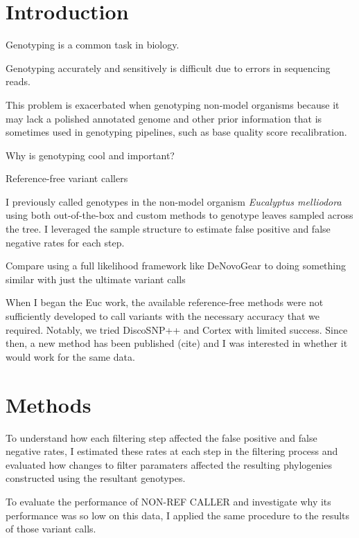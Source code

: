 \documentclass{article}
\begin{document}
\linenumbers

\section{Introduction}
\begin{outline}
	\item Genotyping is a common task in biology.
	\begin{outline}
		\item Genotyping accurately and sensitively is difficult due to errors in sequencing reads.
		\item This problem is exacerbated when genotyping non-model organisms because it may lack a polished annotated genome and other prior information that is sometimes used in genotyping pipelines, such as base quality score recalibration.
	\end{outline}
	\item Why is genotyping cool and important?
	\item Reference-free variant callers
	\begin{outline}
	\end{outline}
	\item I previously called genotypes in the non-model organism \textit{Eucalyptus melliodora} using both out-of-the-box and custom methods to genotype leaves sampled across the tree. I leveraged the sample structure to estimate false positive and false negative rates for each step.
	\item Compare using a full likelihood framework like DeNovoGear to doing something similar with just the ultimate variant calls
	\item When I began the Euc work, the available reference-free methods were not sufficiently developed to call variants with the necessary accuracy that we required. Notably, we tried DiscoSNP++ and Cortex with limited success. Since then, a new method has been published (cite) and I was interested in whether it would work for the same data.

\end{outline}

\section{Methods}
\begin{outline}
	\item To understand how each filtering step affected the false positive and false negative rates, I estimated these rates at each step in the filtering process and evaluated how changes to filter paramaters affected the resulting phylogenies constructed using the resultant genotypes.
	\item To evaluate the performance of NON-REF CALLER and investigate why its performance was so low on this data, I applied the same procedure to the results of those variant calls.
\end{outline}
\end{document}
